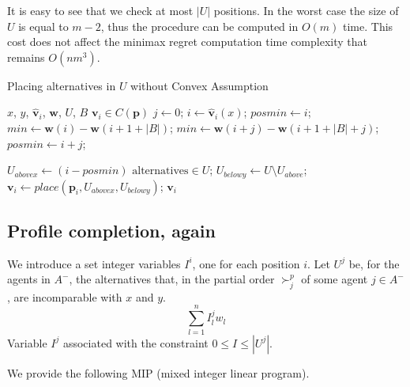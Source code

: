 \documentclass[12pt]{article}
\newcommand{\profile}{\textbf{v}}%
\newcommand{\pprofile}{\textbf{p}}%
\newcommand{\w}{\textbf{w}}%
\begin{document}
It is easy to see that we check at most $|U|$ positions. In the worst case the size of $U$ is equal to $m-2$, thus the procedure can be computed in $O(m)$ time. This cost does not affect the minimax regret computation time complexity that remains $O(nm^3)$.

\begin{algorithm}[h] 
	\caption{Placing alternatives in $U$ without Convex Assumption}
	\label{alg:splittingU} 
	\begin{algorithmic}
		\Require $x$, $y$, $\hat{\profile}_i$, $\w$, $U$, $B$
		\Ensure $\profile_i \in C(\pprofile)$
		\Statex
		\State $ j \gets 0$;
		\State $ i \gets \hat{\profile}_i(x)$;
		\State $ \mathit{posmin} \gets i$;
		\State $ \mathit{min} \gets \w(i) - \w(i+1+|B|)$;
		\If{ $(\w(i+j)-\w(i+1+|B|+j) < \mathit{min})$ }
		\State $ \mathit{min} \gets \w(i+j) - \w(i+1+|B|+j)$;
		\State $ \mathit{posmin} \gets i+j$;
		\EndIf
		\EndWhile
		
		\State $U_{\mathit{abovex}} \gets (i-\mathit{posmin}) \text{ alternatives} \in U $;
		\State $U_{\mathit{belowy}} \gets U \setminus U_{\mathit{above}}$;
		\Statex
		\State $\profile_i \gets place(\pprofile_i,U_{\mathit{abovex}},U_{\mathit{belowy}})$;
		\Statex \Return $\profile_i$
		
	\end{algorithmic}
\end{algorithm}

\subsection{Profile completion, again}
 
 We introduce a set integer variables $I^i$, one for each position $i$.
 Let $U^j$ be, for the agents in $A^-$, the alternatives that, in the partial order $\succ^p_j$ of some agent $j \in A^-$, are incomparable with $x$ and $y$.
 \[ \sum_{l=1}^n I^j_l w_l \]
 Variable $I^j$ associated with the constraint $0 \leq I \leq |U^j|$.
 
 We provide the following MIP (mixed integer linear program).
 


%
\end{document}
